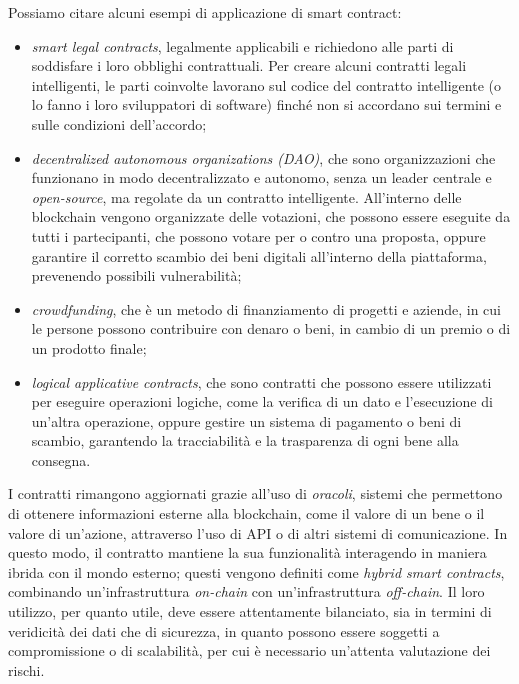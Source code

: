 \newpage

Possiamo citare alcuni esempi di applicazione di smart contract:
\begin{itemize}
    \item \textit{smart legal contracts}, legalmente applicabili e richiedono alle parti di soddisfare i loro obblighi contrattuali.
    Per creare alcuni contratti legali intelligenti, le parti coinvolte lavorano sul codice del contratto intelligente (o lo fanno i loro sviluppatori di software) finché non si accordano sui termini e sulle condizioni dell'accordo;
    \item \textit{decentralized autonomous organizations (DAO)}, che sono organizzazioni che funzionano in modo decentralizzato e autonomo, senza un leader centrale e \textit{open-source}, ma regolate da un contratto intelligente.
    All'interno delle blockchain vengono organizzate delle votazioni, che possono essere eseguite da tutti i partecipanti, che possono votare per o contro una proposta,
    oppure garantire il corretto scambio dei beni digitali all'interno della piattaforma, prevenendo possibili vulnerabilità;
    \item \textit{crowdfunding}, che è un metodo di finanziamento di progetti e aziende, in cui le persone possono contribuire con denaro o beni, in cambio di un premio o di un prodotto finale;
    \item \textit{logical applicative contracts}, che sono contratti che possono essere utilizzati per eseguire operazioni logiche, come la verifica di un dato e l'esecuzione di un'altra operazione,
    oppure gestire un sistema di pagamento o beni di scambio, garantendo la tracciabilità e la trasparenza di ogni bene alla consegna.
\end{itemize}

I contratti rimangono aggiornati grazie all'uso di \textit{oracoli}, sistemi che permettono di ottenere informazioni esterne alla blockchain, come il valore di un bene o il valore di un'azione,
attraverso l'uso di API o di altri sistemi di comunicazione. In questo modo, il contratto mantiene la sua funzionalità interagendo in maniera ibrida con il mondo esterno; questi vengono definiti come \textit{hybrid smart contracts}, 
combinando un'infrastruttura \textit{on-chain} con un'infrastruttura \textit{off-chain}.
Il loro utilizzo, per quanto utile, deve essere attentamente bilanciato, sia in termini di veridicità dei dati che di sicurezza, in quanto possono essere soggetti a compromissione o di scalabilità, per cui è necessario
un'attenta valutazione dei rischi.

